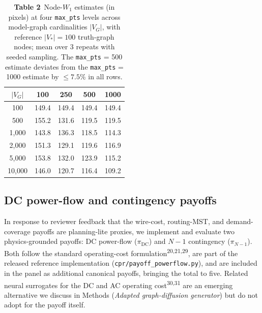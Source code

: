 \documentclass[10pt,a4paper]{article}
\begin{document}
\begin{table}[h]
\centering
\caption{\textbf{Table 2\,\textbar} Node-$W_1$ estimates (in
pixels) at four \texttt{max\_pts} levels across model-graph
cardinalities $|V_G|$, with reference $|V_*| = 100$ truth-graph
nodes; mean over 3 repeats with seeded sampling. The
\texttt{max\_pts} = 500 estimate deviates from the
\texttt{max\_pts} = 1000 estimate by $\le 7.5\%$ in all rows.}
\label{tab:subsample}
\renewcommand{\arraystretch}{1.2}
\begin{tabular}{c c c c c}
\toprule
\rowcolor{NEblue}
\color{white}\textbf{$|V_G|$} & \color{white}\textbf{100} & \color{white}\textbf{250} & \color{white}\textbf{500} & \color{white}\textbf{1000} \\
\midrule
100   & 149.4 & 149.4 & 149.4 & 149.4 \\
500   & 155.2 & 131.6 & 119.5 & 119.5 \\
1{,}000 & 143.8 & 136.3 & 118.5 & 114.3 \\
2{,}000 & 151.3 & 129.1 & 119.6 & 116.9 \\
5{,}000 & 153.8 & 132.0 & 123.9 & 115.2 \\
10{,}000 & 146.0 & 120.7 & 116.4 & 109.2 \\
\bottomrule
\end{tabular}
\end{table}

\subsection{DC power-flow and contingency payoffs}

In response to reviewer feedback that the wire-cost, routing-MST,
and demand-coverage payoffs are planning-lite proxies, we
implement and evaluate two physics-grounded payoffs:
DC power-flow ($\pi_{\mathrm{DC}}$) and $N\!-\!1$ contingency
($\pi_{N\!-\!1}$). Both follow the standard operating-cost
formulation\textsuperscript{20,21,29}, are part of the released
reference implementation (\texttt{cpr/payoff\_powerflow.py}), and
are included in the panel as additional canonical payoffs,
bringing the total to five. Related neural surrogates for the DC
and AC operating cost\textsuperscript{30,31} are an emerging
alternative we discuss in Methods (\textit{Adapted graph-diffusion
generator}) but do not adopt for the payoff itself.
\end{document}
